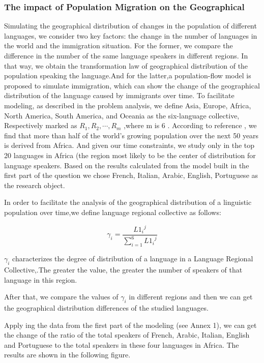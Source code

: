 \subsubsection{The impact of Population Migration on the Geographical}
\noindent
Simulating the geographical distribution of changes in the population of different languages, we consider two key factors: the change in the number of languages in the world and the immigration situation. For the former, we compare the difference in the number of the same language speakers in different regions. In that way, we obtain the transformation law of geographical distribution of the population speaking the language.And for the latter,a population-flow model is proposed to simulate immigration, which can show the change of the geographical distribution of the language caused by immigrants over time. To facilitate modeling, as described in the problem analysis, we define Asia, Europe, Africa, North America, South America, and Oceania as the six-language collective, Respectively marked as ${R_1},{R_2}, \cdots ,{R_m}$ ,where m is 6 . According to reference , we find that more than half of the world's growing population over the next 50 years is derived from Africa. And given our time constraints, we study only in the top 20 languages in Africa (the region most likely to be the center of distribution for language speakers. Based on the results calculated from the model built in the first part of the question we chose French, Italian, Arabic, English, Portuguese as the research object.

In order to facilitate the analysis of the geographical distribution of a linguistic population over time,we define language regional collective as follows:

\begin{equation}
{\gamma _i} = \frac{{L{1_i}^j}}{{\sum\limits_{i = 1}^6 {L{1_i}^j} }}
\end{equation}

${\gamma _i}$ characterizes the degree of distribution of a language in a Language Regional Collective,.The greater the value, the greater the number of speakers of that language in this region.

After that, we compare the values of ${\gamma _i}$ in different regions and then we can get the geographical distribution differences of the studied languages.

Apply ing the data from the first part of the modeling (see Annex 1), we can get the change of the ratio of the total speakers of French, Arabic, Italian, English and Portuguese to the total speakers in these four languages in Africa. The results are shown in the following figure.

